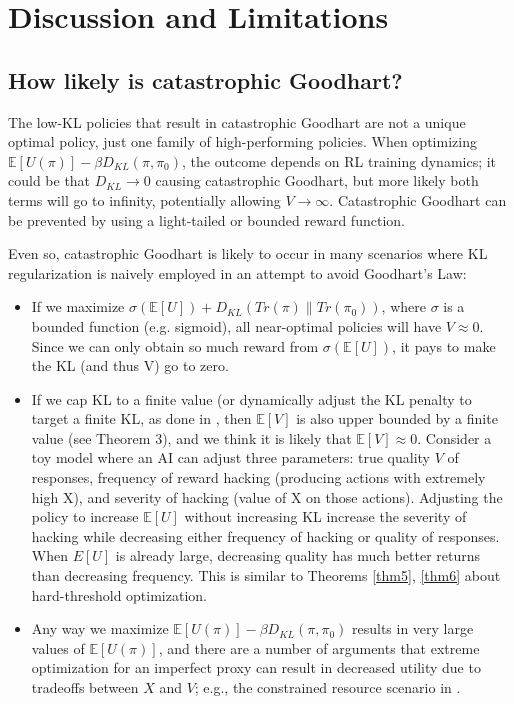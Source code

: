 \documentclass{article}
\theoremstyle{plain}
\theoremstyle{definition}
\theoremstyle{remark}
\begin{document}
\section{Discussion and Limitations\label{sec:discussion}}

\subsection{How likely is catastrophic Goodhart?}

The low-KL policies that result in catastrophic Goodhart are not a unique optimal policy, just one family of high-performing policies. When optimizing $\mathbb{E} [U(\pi)]-\beta D_{K L}\left(\pi, \pi_0 \right)$, the outcome depends on RL training dynamics; it could be that $D_{KL} \to 0$ causing catastrophic Goodhart, but more likely both terms will go to infinity, potentially allowing $V \to \infty$. Catastrophic Goodhart can be prevented by using a light-tailed or bounded reward function.

Even so, catastrophic Goodhart is likely to occur in many scenarios where KL regularization is naively employed in an attempt to avoid Goodhart’s Law:

\begin{itemize}
    \item If we maximize $\sigma(\mathbb E[U]) + D_{KL}(Tr(\pi) \| Tr(\pi_0))$, where $\sigma$ is a bounded function (e.g. sigmoid), all near-optimal policies will have $V \approx 0$. Since we can only obtain so much reward from $\sigma(\mathbb{E}[U])$, it pays to make the KL (and thus V) go to zero.
    \item If we cap KL to a finite value (or dynamically adjust the KL penalty to target a finite KL, as done in \citet{ziegler2020finetuning}, then $\mathbb E[V]$ is also upper bounded by a finite value (see Theorem 3), and we think it is likely that $\mathbb E[V] \approx 0$. Consider a toy model where an AI can adjust three parameters: true quality $V$ of responses, frequency of reward hacking (producing actions with extremely high X), and severity of hacking (value of X on those actions). Adjusting the policy to increase $\mathbb E[U]$ without increasing KL increase the severity of hacking while decreasing either frequency of hacking or quality of responses. When $E[U]$ is already large, decreasing quality has much better returns than decreasing frequency. This is similar to Theorems \ref{thm5}, \ref{thm6} about hard-threshold optimization.
    \item Any way we maximize $\mathbb{E} [U(\pi)]-\beta D_{K L}\left(\pi, \pi_0 \right)$ results in very large values of $\mathbb E[U(\pi)]$, and there are a number of arguments that extreme optimization for an imperfect proxy can result in decreased utility due to tradeoffs between $X$ and $V$; e.g., the constrained resource scenario in \citep{zhuang2021consequences}.
\end{itemize}
\end{document}
